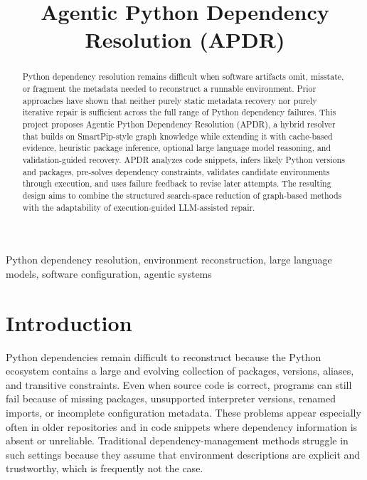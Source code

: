 \documentclass[conference]{IEEEtran}
\begin{document}
\title{Agentic Python Dependency Resolution (APDR)}

\author{
\and
{}
\and
{}
}

\maketitle

\begin{abstract}
Python dependency resolution remains difficult when software artifacts omit, misstate, or fragment the metadata needed to reconstruct a runnable environment. Prior approaches have shown that neither purely static metadata recovery nor purely iterative repair is sufficient across the full range of Python dependency failures. This project proposes Agentic Python Dependency Resolution (APDR), a hybrid resolver that builds on SmartPip-style graph knowledge while extending it with cache-based evidence, heuristic package inference, optional large language model reasoning, and validation-guided recovery. APDR analyzes code snippets, infers likely Python versions and packages, pre-solves dependency constraints, validates candidate environments through execution, and uses failure feedback to revise later attempts. The resulting design aims to combine the structured search-space reduction of graph-based methods with the adaptability of execution-guided LLM-assisted repair.
\end{abstract}

\begin{IEEEkeywords}
Python dependency resolution, environment reconstruction, large language models, software configuration, agentic systems
\end{IEEEkeywords}

\section{Introduction}
Python dependencies remain difficult to reconstruct because the Python ecosystem contains a large and evolving collection of packages, versions, aliases, and transitive constraints. Even when source code is correct, programs can still fail because of missing packages, unsupported interpreter versions, renamed imports, or incomplete configuration metadata. These problems appear especially often in older repositories and in code snippets where dependency information is absent or unreliable. Traditional dependency-management methods struggle in such settings because they assume that environment descriptions are explicit and trustworthy, which is frequently not the case.
\end{document}
